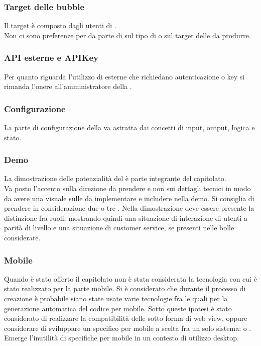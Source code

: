 \subsubsection{Target delle bubble}
Il target è composto dagli utenti di .\\
Non ci sono preferenze per da parte di \Proponente{} sul tipo di  o sul target delle  da produrre. 

\subsubsection{API esterne e APIKey}
Per quanto riguarda l'utilizzo di  esterne che richiedano autenticazione o key si rimanda l'onere all'amministratore della .

\subsubsection{Configurazione}
La parte di configurazione della  va astratta dai concetti di input, output, logica e stato.

\subsubsection{Demo}
La dimostrazione delle potenzialità del  è parte integrante del capitolato.\\
Va posto l'accento sulla direzione da prendere e non sui dettagli tecnici in modo da avere una visuale sulle  da implementare e includere nella demo. Si consiglia di prendere in considerazione due o tre .
Nella dimostrazione deve essere presente la distinzione fra ruoli, mostrando quindi una situazione di interazione di utenti a parità di livello e una situazione di customer service, se presenti nelle bolle considerate. 

\subsubsection{Mobile}
Quando è stato offerto il capitolato non è stata considerata la tecnologia con cui  è stato realizzato per la parte mobile. Si è considerato che durante il processo di creazione è probabile siano state usate varie tecnologie fra le quali  per la generazione automatica del codice per mobile. Sotto queste ipotesi è stato considerato di realizzare la compatibilità delle  sotto forma di web view, oppure considerare di sviluppare un  specifico per mobile a scelta fra un solo sistema:  o .  
Emerge l'inutilità di  specifiche per mobile in un contesto di utilizzo desktop.

\clearpage

